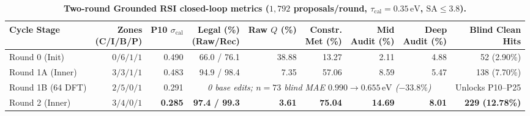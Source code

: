 \documentclass[11pt,a4paper]{article}
\begin{document}
\begin{table}[!h]
  \centering
  \caption{\textbf{Two-round Grounded RSI closed-loop metrics ($1{,}792$ proposals/round, $\tau_{\text{cal}} = 0.35\,\text{eV}$, $\text{SA}\le 3.8$).}}
  \label{tab:ed_rsi}
  \scriptsize
  \setlength{\tabcolsep}{1.6pt}
  \begin{tabular}{lrrrrrrrr}
    \toprule
    Cycle Stage & \shortstack[r]{Zones\\(C/I/B/P)} & \shortstack[r]{P10\\$\sigma_{\text{cal}}$} & \shortstack[r]{Legal (\%)\\(Raw/Rec)} & \shortstack[r]{Raw\\$Q$ (\%)} & \shortstack[r]{Constr.\\Met (\%)} & \shortstack[r]{Mid\\Audit (\%)} & \shortstack[r]{Deep\\Audit (\%)} & \shortstack[r]{Blind Clean\\Hits} \\
    \midrule
    Round 0 (Init) & $0/6/1/1$ & 0.490 & 66.0 / 76.1 & 38.88 & 13.27 & 2.11 & 4.88 & 52 (2.90\%) \\
    Round 1A (Inner) & $3/3/1/1$ & 0.483 & 94.9 / 98.4 & 7.35 & 57.06 & 8.59 & 5.47 & 138 (7.70\%) \\
    Round 1B (64 DFT) & $2/5/0/1$ & 0.291 & \multicolumn{5}{c}{\textit{0 base edits; $n=73$ blind MAE $0.990 \to 0.655\,\text{eV}$ ($-33.8\%$)}} & Unlocks P10--P25 \\
    Round 2 (Inner) & $3/4/0/1$ & \textbf{0.285} & \textbf{97.4 / 99.3} & \textbf{3.61} & \textbf{75.04} & \textbf{14.69} & \textbf{8.01} & \textbf{229 (12.78\%)} \\
    \bottomrule
  \end{tabular}
\end{table}
\end{document}
